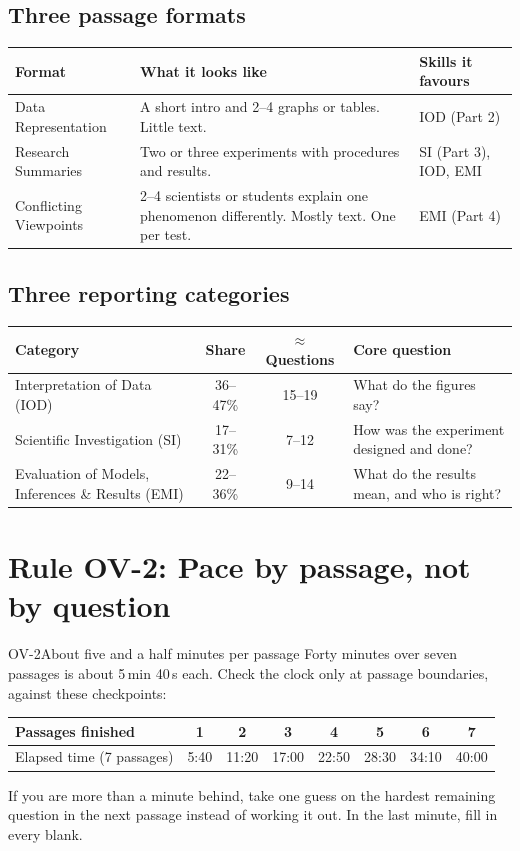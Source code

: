 \documentclass[11pt]{article}
\begin{document}
\subsection*{Three passage formats}
\small
\begin{tabularx}{\linewidth}{@{}l X l@{}}
\toprule
Format & What it looks like & Skills it favours\\\midrule
Data Representation & A short intro and 2--4 graphs or tables. Little text. & IOD (Part 2)\\
Research Summaries & Two or three experiments with procedures and results. & SI (Part 3), IOD, EMI\\
Conflicting Viewpoints & 2--4 scientists or students explain one phenomenon differently. Mostly text. One per test. & EMI (Part 4)\\
\bottomrule
\end{tabularx}
\normalsize

\subsection*{Three reporting categories}
\small
\begin{tabularx}{\linewidth}{@{}l c c X@{}}
\toprule
Category & Share & $\approx$ Questions & Core question\\\midrule
Interpretation of Data (IOD) & 36--47\% & 15--19 & What do the figures say?\\
Scientific Investigation (SI) & 17--31\% & 7--12 & How was the experiment designed and done?\\
Evaluation of Models, Inferences \& Results (EMI) & 22--36\% & 9--14 & What do the results mean, and who is right?\\
\bottomrule
\end{tabularx}
\normalsize

\section{Rule OV-2: Pace by passage, not by question}

\begin{rulebox}{OV-2}{About five and a half minutes per passage}
Forty minutes over seven passages is about 5\,min 40\,s each. Check the clock only at passage boundaries, against these checkpoints:
\begin{center}
\renewcommand{\arraystretch}{1.1}
\begin{tabular}{@{}l c c c c c c c@{}}
\toprule
Passages finished & 1 & 2 & 3 & 4 & 5 & 6 & 7\\\midrule
Elapsed time (7 passages) & 5:40 & 11:20 & 17:00 & 22:50 & 28:30 & 34:10 & 40:00\\
\bottomrule
\end{tabular}
\end{center}
If you are more than a minute behind, take one guess on the hardest remaining question in the next passage instead of working it out. In the last minute, fill in every blank.
\end{rulebox}
\end{document}
